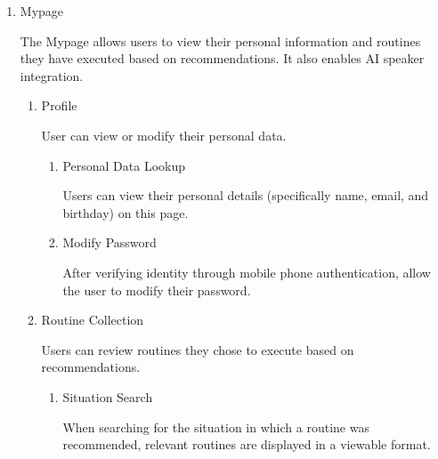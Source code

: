\documentclass[conference]{IEEEtran}
\begin{document}
\begin{enumerate}[label=\arabic*]
    \vspace{1em}

    \item Mypage\par
    \vspace{0.3em}
    The Mypage allows users to view their personal information and routines they have executed based on recommendations. It also enables AI speaker integration.
    \vspace{0.3em}

    \begin{enumerate}[label=\arabic*)]
        \item Profile\par
        \vspace{0.3em}
        User can view or modify their personal data.
        \vspace{0.3em}

        \begin{enumerate}[label=\alph*)]
            \item Personal Data Lookup\par
            \vspace{0.3em}
            Users can view their personal details (specifically name, email, and birthday) on this page.

            \vspace{0.5em}

            \item Modify Password\par
            \vspace{0.3em}
            After verifying identity through mobile phone authentication, allow the user to modify their password.
        \end{enumerate}

        \vspace{0.5em}

        \item Routine Collection\par
        \vspace{0.3em}
        Users can review routines they chose to execute based on recommendations.
        \vspace{0.3em}

        \begin{enumerate}[label=\alph*)]
            \item Situation Search\par
            \vspace{0.3em}
            When searching for the situation in which a routine was recommended, relevant routines are displayed in a viewable format.


\end{enumerate}
\end{enumerate}
\end{enumerate}
\end{document}
